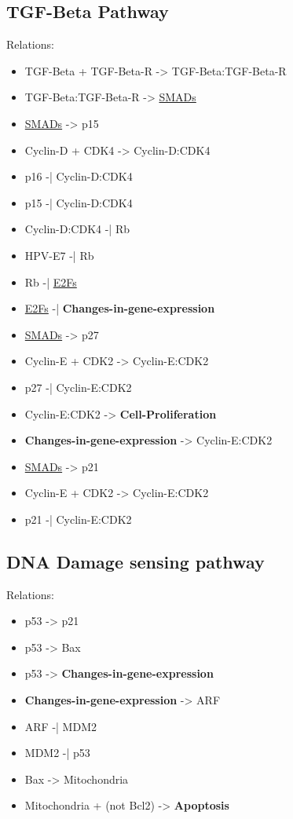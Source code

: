 \documentclass[11pt]{article}
\begin{document}
\subsection{TGF-Beta Pathway}
\label{sec-2-2}
Relations:
\begin{itemize}
\item TGF-Beta + TGF-Beta-R -> TGF-Beta:TGF-Beta-R
\item TGF-Beta:TGF-Beta-R -> \uline{SMADs}

\item \uline{SMADs} -> p15
\item Cyclin-D + CDK4 -> Cyclin-D:CDK4
\item p16 -| Cyclin-D:CDK4
\item p15 -| Cyclin-D:CDK4
\item Cyclin-D:CDK4 -| Rb
\item HPV-E7 -| Rb
\item Rb -| \uline{E2Fs}
\item \uline{E2Fs} -| \textbf{Changes-in-gene-expression}

\item \uline{SMADs} -> p27
\item Cyclin-E + CDK2 -> Cyclin-E:CDK2
\item p27 -| Cyclin-E:CDK2
\item Cyclin-E:CDK2 -> \textbf{Cell-Proliferation}
\item \textbf{Changes-in-gene-expression} -> Cyclin-E:CDK2

\item \uline{SMADs} -> p21
\item Cyclin-E + CDK2 -> Cyclin-E:CDK2
\item p21 -| Cyclin-E:CDK2
\end{itemize}
\subsection{DNA Damage sensing pathway}
\label{sec-2-3}

Relations:
\begin{itemize}
\item p53 -> p21
\item p53 -> Bax
\item p53 -> \textbf{Changes-in-gene-expression}
\item \textbf{Changes-in-gene-expression} -> ARF
\item ARF -| MDM2
\item MDM2 -| p53
\item Bax -> Mitochondria
\item Mitochondria + (not Bcl2) -> \textbf{Apoptosis}
\end{itemize}
\end{document}
